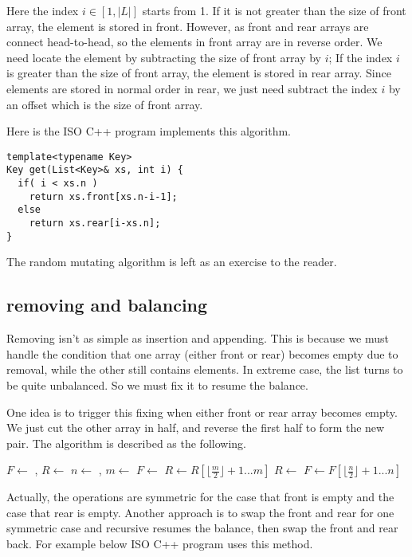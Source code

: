 \documentclass[UTF8]{article}
\begin{document}
Here the index $i \in [1, |L|]$ starts from 1. If it is not greater than the size of front
array, the element is stored in front. However, as front and rear arrays are connect head-to-head,
so the elements in front array are in reverse order. We need locate the element by subtracting
the size of front array by $i$; If the index $i$ is greater than the size of front array,
the element is stored in rear array. Since elements are stored in normal order in rear,
we just need subtract the index $i$ by an offset which is the size of front array.

Here is the ISO C++ program implements this algorithm.

\begin{lstlisting}
template<typename Key>
Key get(List<Key>& xs, int i) {
  if( i < xs.n )
    return xs.front[xs.n-i-1];
  else
    return xs.rear[i-xs.n];
}
\end{lstlisting}

The random mutating algorithm is left as an exercise to the reader.

\subsection{removing and balancing}
Removing isn't as simple as insertion and appending. This is because we must handle the
condition that one array (either front or rear) becomes empty due to removal, while the
other still contains elements. In extreme case, the list turns to be quite unbalanced.
So we must fix it to resume the balance.

One idea is to trigger this fixing when either front or rear array becomes empty. We just
cut the other array in half, and reverse the first half to form the new pair. The algorithm
is described as the following.

\begin{algorithmic}
  \State $F \gets$ , $R \gets$ 
  \State $n \gets$ , $m \gets$ 
    \State $F \gets$ 
    \State $R \gets R[\lfloor \frac{m}{2} \rfloor + 1 ... m]$
    \State $R \gets$ 
    \State $F \gets F[\lfloor \frac{n}{2} \rfloor + 1 ... n]$
  \EndIf
\EndFunction
\end{algorithmic}

Actually, the operations are symmetric for the case that front is empty and the case that
rear is empty. Another approach is to swap the front and rear for one symmetric case
and recursive resumes the balance, then swap the front and rear back. For example
below ISO C++ program uses this method.
\end{document}
